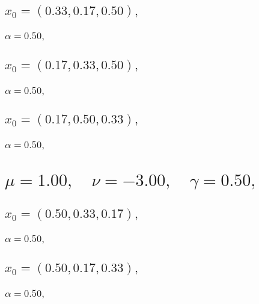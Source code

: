 \documentclass[a4paper]{article}
\begin{document}
\begin{multicols*}{2}
   \subsection{\(x_0 = (0.33,0.17,0.50),\quad \)}
   

   \subsubsection{\(\alpha = 0.50,\quad \)}
   

   \subsection{\(x_0 = (0.17,0.33,0.50),\quad \)}
   

   \subsubsection{\(\alpha = 0.50,\quad \)}
   

   \subsection{\(x_0 = (0.17,0.50,0.33),\quad \)}
   

   \subsubsection{\(\alpha = 0.50,\quad \)}
   

   \section{\(\mu = 1.00,\quad \nu = -3.00,\quad \gamma = 0.50,\quad \)}
   

   \subsection{\(x_0 = (0.50,0.33,0.17),\quad \)}
   

   \subsubsection{\(\alpha = 0.50,\quad \)}
   

   \subsection{\(x_0 = (0.50,0.17,0.33),\quad \)}
   

   \subsubsection{\(\alpha = 0.50,\quad \)}
   


\end{multicols*}
\end{document}
